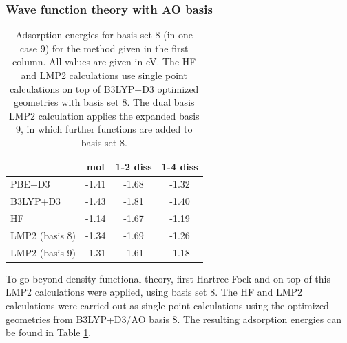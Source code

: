 \documentclass[11pt,DIV=13,BCOR=5mm,a4paper,headinclude]{scrbook}
\begin{document}
\subsubsection{Wave function theory with AO basis}

\begin{table}[!h]
  \centering
   \caption{Adsorption energies for basis set 8 (in one case 9) for the method given in the first column.
All values are given in eV. The HF and LMP2 calculations use single point calculations on top of B3LYP+D3 optimized geometries with basis set 8.
The dual basis LMP2 calculation applies the expanded basis 9, in which further functions are added to basis set 8.}
  \begin{tabular}{l|ccc}
  \toprule
   &mol & 1-2 diss & 1-4 diss \\\midrule
PBE+D3 & -1.41 & -1.68 & -1.32 \\
B3LYP+D3 & -1.43 & -1.81 & -1.40 \\\midrule
HF &-1.14 & -1.67 & -1.19\\
LMP2 (basis 8) & -1.34 & -1.69 & -1.26\\
LMP2 (basis 9) & -1.31 & -1.61 & -1.18 \\ %
\bottomrule
  \end{tabular}
  \label{tab:combined_results}
\end{table}

% 
% 

To go beyond density functional theory, first Hartree-Fock and on top of this LMP2 calculations were applied, using basis set 8.
The HF and LMP2 calculations were carried out as single point calculations using the optimized geometries from B3LYP+D3/AO basis 8.
The resulting adsorption energies can be found in Table \ref{tab:combined_results}. %
\end{document}
